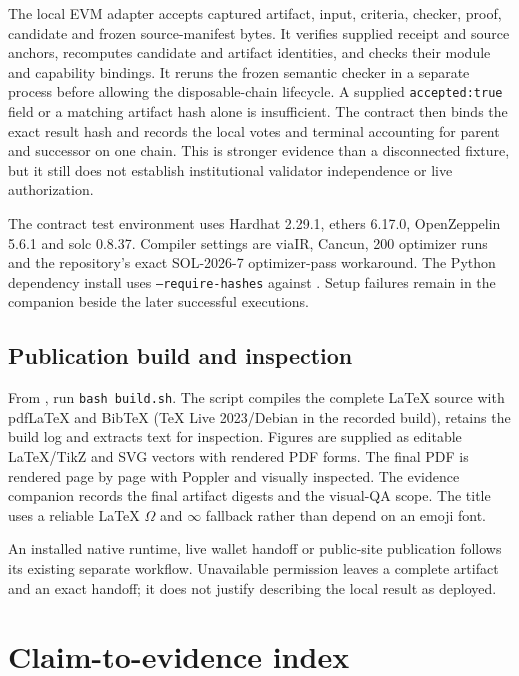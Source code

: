 \documentclass[11pt]{article}
\newcommand{\filename}[1]{\path{#1}}
\begin{document}
The local EVM adapter accepts captured artifact, input, criteria, checker, proof, candidate and frozen source-manifest bytes. It verifies supplied receipt and source anchors, recomputes candidate and artifact identities, and checks their module and capability bindings. It reruns the frozen semantic checker in a separate process before allowing the disposable-chain lifecycle. A supplied \texttt{accepted:true} field or a matching artifact hash alone is insufficient. The contract then binds the exact result hash and records the local votes and terminal accounting for parent and successor on one chain. This is stronger evidence than a disconnected fixture, but it still does not establish institutional validator independence or live authorization.

The contract test environment uses Hardhat 2.29.1, ethers 6.17.0, OpenZeppelin 5.6.1 and solc 0.8.37. Compiler settings are viaIR, Cancun, 200 optimizer runs and the repository's exact SOL-2026-7 optimizer-pass workaround. The Python dependency install uses \texttt{--require-hashes} against \filename{requirements-agent.lock}. Setup failures remain in the companion beside the later successful executions.

\subsection{Publication build and inspection}

From \filename{publication/}, run \texttt{bash build.sh}. The script compiles the complete \LaTeX{} source with pdfLaTeX and BibTeX (TeX Live 2023/Debian in the recorded build), retains the build log and extracts text for inspection. Figures are supplied as editable \LaTeX/TikZ and SVG vectors with rendered PDF forms. The final PDF is rendered page by page with Poppler and visually inspected. The evidence companion records the final artifact digests and the visual-QA scope. The title uses a reliable \LaTeX{} $\Omega$ and $\infty$ fallback rather than depend on an emoji font.

An installed native runtime, live wallet handoff or public-site publication follows its existing separate workflow. Unavailable permission leaves a complete artifact and an exact handoff; it does not justify describing the local result as deployed.


\clearpage
\appendix

\section{Claim-to-evidence index}
\end{document}
